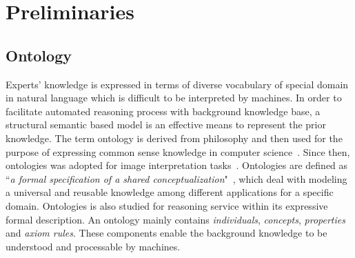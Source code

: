 \documentclass{article}
\begin{document}
% 
% 

\section{Preliminaries}\label{sec:pre}
\subsection{Ontology}
Experts' knowledge is expressed in terms of diverse vocabulary of special domain in natural language which is difficult to be interpreted by machines.
In order to facilitate automated reasoning process with background knowledge base, a structural semantic based model is  an effective means to represent the prior knowledge.
The term ontology is derived from philosophy and then used for the purpose of expressing common sense knowledge in computer science~\cite{alexander1986knowledge}.
Since then, ontologies was adopted for image interpretation tasks~\cite{bannour2011towards,Hudelot2008fuzzy,town2006ontological}.
Ontologies are defined as “\textit{a formal specification of a shared conceptualization}"~\cite{studer1998knowledge},
which deal with modeling a universal and reusable knowledge among different applications for a specific domain.
Ontologies is also studied for reasoning service within its expressive formal description. 
An ontology mainly contains  \textit{individuals}, \textit{concepts}, \textit{properties} and \textit{axiom rules}. 
These components enable the background knowledge to be understood and processable by machines.
\end{document}
